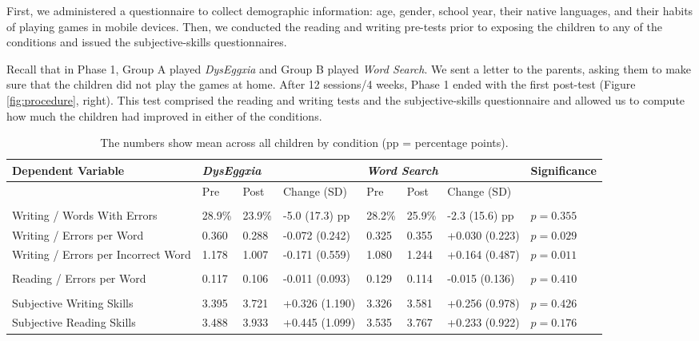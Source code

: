 \documentclass[letterpaper]{sig-alternate-2013}
\begin{document}
First, we administered a questionnaire to collect demographic information: age, gender, school year, their native languages, and their habits of playing games in mobile devices. Then, we conducted the reading and writing pre-tests prior to exposing the children to any of the conditions and issued the subjective-skills questionnaires. 

Recall that in Phase 1, Group A played {\it DysEggxia} and Group B played {\it Word Search}. We sent a letter to the parents, asking them to make sure that the children did not play the games at home. After 12 sessions/4 weeks, Phase 1 ended with the first post-test (Figure \ref{fig:procedure}, right). This test comprised the reading and writing tests and the subjective-skills questionnaire and allowed us to compute how much the children had improved in either of the conditions.

\begin{table*}[t!]
\begin{center}
\begin{tabular}{llll|llll} \toprule
	{\bf Dependent Variable} &  \multicolumn{3}{l}{{\it DysEggxia}} & \multicolumn{3}{l}{\it Word Search} & Significance \\
	\midrule
	{}   & Pre   & Post 	& Change (SD)  & Pre   & Post 	& Change (SD) & {}\\
	\\
	Writing / Words With Errors	&  28.9\% & 23.9\% & -5.0 (17.3) pp  &  28.2\% & 25.9\% & -2.3 (15.6) pp & $p = 0.355$\\
	Writing / Errors per Word   &  0.360 & 0.288 & -0.072 (0.242)  &  0.325 & 0.355 & +0.030 (0.223) & $p = 0.029$\\
	Writing / Errors per Incorrect Word   &  1.178 & 1.007 & -0.171 (0.559)  &  1.080 & 1.244 & +0.164 (0.487) & $p = 0.011$\\
	\\
	Reading / Errors per Word    &  0.117 & 0.106 & -0.011 (0.093)  &  0.129 & 0.114 & -0.015 (0.136) & $p = 0.410$\\
	\\
	Subjective Writing Skills   &  3.395 & 3.721 & +0.326 (1.190)  &  3.326 & 3.581 & +0.256 (0.978) & $p = 0.426$\\
	Subjective Reading Skills  &  3.488 & 3.933 & +0.445 (1.099)  &  3.535 & 3.767 & +0.233 (0.922) & $p = 0.176$\\	
	\bottomrule
\end{tabular}
\end{center}
\vspace{-0.2cm}
\caption{The numbers show mean across all children by condition (pp = percentage points).}
\label{tab:resultsall}
\vspace{-0.1cm}
\end{table*}
\end{document}
